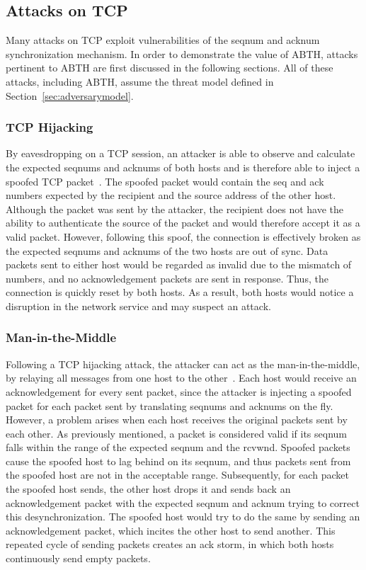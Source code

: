 \documentclass{sig-alternate}
\begin{document}
\subsection{Attacks on TCP}

Many attacks on TCP exploit vulnerabilities of the seqnum and acknum synchronization mechanism.
In order to demonstrate the value of ABTH, attacks pertinent to ABTH are first discussed in the following sections.
All of these attacks, including ABTH, assume the threat model defined in Section~\ref{sec:adversarymodel}.

\subsubsection{TCP Hijacking}

By eavesdropping on a TCP session, an attacker is able to observe and calculate the expected seqnums and acknums of both hosts and is therefore able to inject a spoofed TCP packet~\cite{harris:tcpattacks}.
The spoofed packet would contain the seq and ack numbers expected by the recipient and the source address of the other host.
Although the packet was sent by the attacker, the recipient does not have the ability to authenticate the source of the packet and would therefore accept it as a valid packet.
However, following this spoof, the connection is effectively broken as the expected seqnums and acknums of the two hosts are out of sync.
Data packets sent to either host would be regarded as invalid due to the mismatch of numbers, and no acknowledgement packets are sent in response.
Thus, the connection is quickly reset by both hosts.
As a result, both hosts would notice a disruption in the network service and may suspect an attack.

\subsubsection{Man-in-the-Middle}

Following a TCP hijacking attack, the attacker can act as the man-in-the-middle, by relaying all messages from one host to the other~\cite{joncheray:simpleattack, gregg:stackhack}.
Each host would receive an acknowledgement for every sent packet, since the attacker is injecting a spoofed packet for each packet sent by translating seqnums and acknums on the fly.
However, a problem arises when each host receives the original packets sent by each other.
As previously mentioned, a packet is considered valid if its seqnum falls within the range of the expected seqnum and the rcvwnd.
Spoofed packets cause the spoofed host to lag behind on its seqnum, and thus packets sent from the spoofed host are not in the acceptable range.
Subsequently, for each packet the spoofed host sends, the other host drops it and sends back an acknowledgement packet with the expected seqnum and acknum trying to correct this desynchronization.
The spoofed host would try to do the same by sending an acknowledgement packet, which incites the other host to send another.
This repeated cycle of sending packets creates an ack storm, in which both hosts continuously send empty packets.
\end{document}
